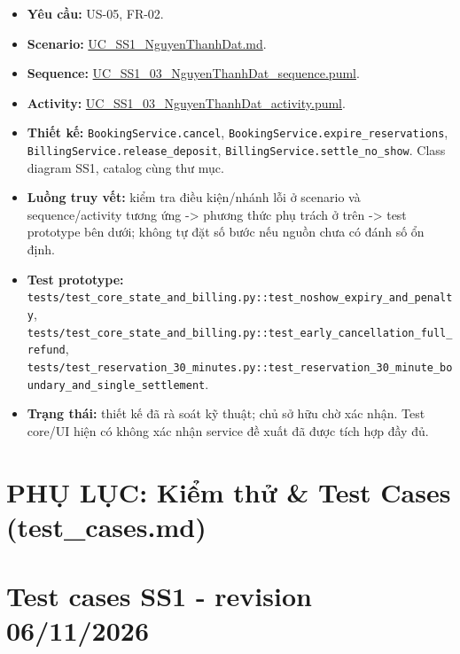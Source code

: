 \documentclass[11pt,a4paper]{article}
\providecommand{\tightlist}{%
  \setlength{\itemsep}{0pt}\setlength{\parskip}{0pt}}
\begin{document}
\begin{itemize}
\tightlist
\item
  \textbf{Yêu cầu:} US-05, FR-02.
\item
  \textbf{Scenario:}
  \href{../../../../docs/diagrams/Use-case\%20detail-scenario/SS1/Usecase\%20scenario/UC_SS1_NguyenThanhDat.md}{UC\_SS1\_NguyenThanhDat.md}.
\item
  \textbf{Sequence:}
  \href{../../../../docs/diagrams/Use-case\%20detail-scenario/SS1/Sequence\%20diagrams/UC_SS1_03_NguyenThanhDat_sequence.puml}{UC\_SS1\_03\_NguyenThanhDat\_sequence.puml}.
\item
  \textbf{Activity:}
  \href{../../../../docs/diagrams/Use-case\%20detail-scenario/SS1/Activity\%20diagrams/UC_SS1_03_NguyenThanhDat_activity.puml}{UC\_SS1\_03\_NguyenThanhDat\_activity.puml}.
\item
  \textbf{Thiết kế:} \texttt{BookingService.cancel},
  \texttt{BookingService.expire\_reservations},
  \texttt{BillingService.release\_deposit},
  \texttt{BillingService.settle\_no\_show}. Class diagram SS1, catalog
  cùng thư mục.
\item
  \textbf{Luồng truy vết:} kiểm tra điều kiện/nhánh lỗi ở scenario và
  sequence/activity tương ứng -\textgreater{} phương thức phụ trách ở
  trên -\textgreater{} test prototype bên dưới; không tự đặt số bước nếu
  nguồn chưa có đánh số ổn định.
\item
  \textbf{Test prototype:}
  \texttt{tests/test\_core\_state\_and\_billing.py::test\_noshow\_expiry\_and\_penalty},
  \texttt{tests/test\_core\_state\_and\_billing.py::test\_early\_cancellation\_full\_refund},
  \texttt{tests/test\_reservation\_30\_minutes.py::test\_reservation\_30\_minute\_boundary\_and\_single\_settlement}.
\item
  \textbf{Trạng thái:} thiết kế đã rà soát kỹ thuật; chủ sở hữu chờ xác
  nhận. Test core/UI hiện có không xác nhận service đề xuất đã được tích
  hợp đầy đủ.
\end{itemize}

\newpage
\section*{PHỤ LỤC: Kiểm thử \& Test Cases (test\_cases.md)}
\hypertarget{test-cases-ss1---revision-06112026}{%
\section{Test cases SS1 - revision
06/11/2026}\label{test-cases-ss1---revision-06112026}}
\end{document}
